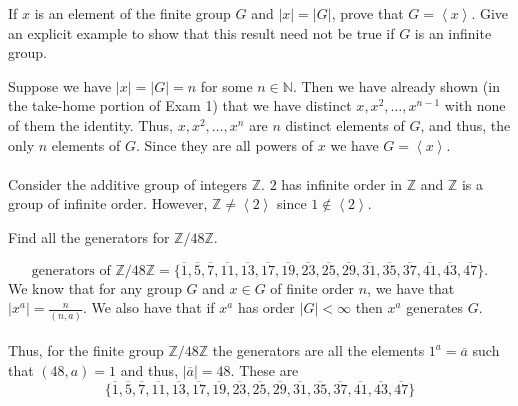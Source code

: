 \documentclass[12 pt, letterpaper]{hmcpset}
\begin{document}
\begin{problem}
	If $x$ is an element of the finite group $G$ and $\lvert x \rvert = \lvert G \rvert$, prove that $G = \left < x \right >$. Give an explicit example to show that this result need not be true if $G$ is an infinite group.
\end{problem}

\begin{solution}
	Suppose we have $\lvert x \rvert = \lvert G \rvert = n$ for some $n \in \mathbb{N}$. Then we have already shown (in the take-home portion of Exam 1) that we have distinct $x, x^{2}, \dots, x^{n - 1}$ with none of them the identity. Thus, $x, x^{2}, \dots, x^{n}$ are $n$ distinct elements of $G$, and thus, the only $n$ elements of $G$. Since they are all powers of $x$ we have $G = \left < x \right >$. \\\\
	Consider the additive group of integers $\mathbb{Z}$. $2$ has infinite order in $\mathbb{Z}$ and $\mathbb{Z}$ is a group of infinite order. However, $\mathbb{Z} \neq \left < 2 \right >$ since $1 \notin \left < 2 \right >$.
\end{solution}

\pagebreak

\begin{problem}
	Find all the generators for $\mathbb{Z}/48 \mathbb{Z}$.
\end{problem}

\begin{solution}
	\[
		\boxed{
			\text{generators of } \mathbb{Z}/48 \mathbb{Z} = \{ \overline{1}, \overline{5}, \overline{7}, \overline{11}, \overline{13}, \overline{17}, \overline{19}, \overline{23}, \overline{25}, \overline{29}, \overline{31}, \overline{35}, \overline{37}, \overline{41}, \overline{43}, \overline{47} \}.
		}
	\]	
	We know that for any group $G$ and $x \in G$ of finite order $n$, we have that $\lvert x^{a} \rvert = \frac{n}{(n, a)}$. We also have that if $x^{a}$ has order $\lvert G \rvert < \infty$ then $x^{a}$ generates $G$. \\\\
	Thus, for the finite group $\mathbb{Z}/48\mathbb{Z}$ the generators are all the elements $1^{a} = \overline{a}$ such that $(48, a) = 1$ and thus, $\lvert \overline{a} \rvert = 48$. These are
	\[
		\{ \overline{1}, \overline{5}, \overline{7}, \overline{11}, \overline{13}, \overline{17}, \overline{19}, \overline{23}, \overline{25}, \overline{29}, \overline{31}, \overline{35}, \overline{37}, \overline{41}, \overline{43}, \overline{47} \}
	\]
\end{solution}
\end{document}
